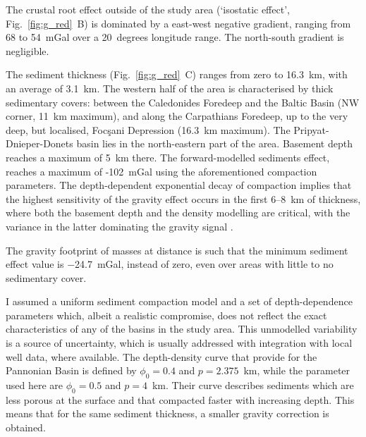 The crustal root effect outside of the study area (`isostatic effect', Fig.~\ref{fig:g_red}~B) is dominated by a east-west negative gradient, ranging from 68 to 54~mGal over a 20~degrees longitude range.
The north-south gradient is negligible.

The sediment thickness (Fig.~\ref{fig:g_red}~C) ranges from zero to 16.3~\si{\kilo \metre}, with an average of 3.1~\si{\kilo \metre}.
The western half of the area is characterised by thick sedimentary covers: between the Caledonides Foredeep and the Baltic Basin (NW corner, 11~\si{\kilo \metre} maximum), and along the Carpathians Foredeep, up to the very deep, but localised, Focşani Depression (16.3~\si{\kilo \metre} maximum).
The Pripyat-Dnieper-Donets basin lies in the north-eastern part of the area.
Basement depth reaches a maximum of 5~\si{\kilo \metre} there.
The forward-modelled sediments effect, reaches a maximum of -102~mGal using the aforementioned compaction parameters.
The depth-dependent exponential decay of compaction implies that the highest sensitivity of the gravity effect occurs in the first 6--8~\si{\kilo \metre} of thickness, where both the basement depth and the density modelling are critical, with the variance in the latter dominating the gravity signal \parencite{Kaban2010}.

The gravity footprint of masses at distance is such that the minimum sediment effect value is \SI{-24.7}{mGal}, instead of zero, even over areas with little to no sedimentary cover.

I assumed a uniform sediment compaction model and a set of depth-dependence parameters which, albeit a realistic compromise, does not reflect the exact characteristics of any of the basins in the study area.
This unmodelled variability is a source of uncertainty, which is usually addressed with integration with local well data, where available.
The depth-density curve that \textcite{Kaban2010} provide for the Pannonian Basin is defined by $\phi_0 = 0.4$ and $p = 2.375$~{km}, while the parameter used here are $\phi_0 = 0.5$ and $p = 4$~{km}.
Their \parencite{Kaban2010} curve describes sediments which are less porous at the surface and that compacted faster with increasing depth.
This means that for the same sediment thickness, a smaller gravity correction is obtained.

